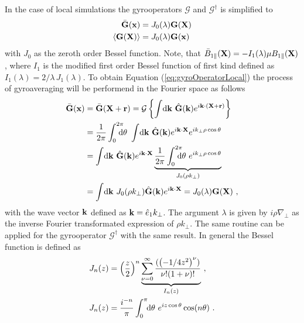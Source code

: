 In the case of local simulations the gyrooperators $\mathcal{G}$ and $\mathcal{G}^\dagger$ is simplified to
\begin{gather}
    \begin{aligned}
        \bar{\boldsymbol{\mathbf{G}}}(\boldsymbol{\mathbf{x}}) &= J_0(\lambda) \boldsymbol{\mathbf{G}}(\boldsymbol{\mathbf{X}}) \\
        \langle\boldsymbol{\mathbf{G}}(\boldsymbol{\mathbf{X}})\rangle &= J_0(\lambda) \boldsymbol{\mathbf{G}}(\boldsymbol{\mathbf{x}})
    \end{aligned}
    \label{eq:gyroOperatorLocal}
\end{gather}
with $J_0$ as the zeroth order Bessel function. Note, that $\bar{B}_{1\parallel}(\boldsymbol{\mathbf{X}}) = - I_1(\lambda)\mu B_{1\parallel} (\boldsymbol{\mathbf{X}})$, where $I_1$ is the modified first order Bessel function of first kind defined as $I_1(\lambda) = 2/\lambda \, J_1(\lambda)$. To obtain Equation (\ref{eq:gyroOperatorLocal}) the process of gyroaveraging will be performend in the Fourier space as follows
\begin{gather}
    \begin{aligned}
        \ga{\vect{G}}(\x) &= \ga{\vect{G}}(\X + \vect{r}) = \tga{\left\{\ints \mathrm{d}\vect{k} ~ \hat{\vect{G}}(\vect{k}) e^{i \vect{k} \cdot (\X + \vect{r})} \right\}} \\
                          &= \frac{1}{2\pi} \intss{0}{2\pi} \dtheta ~ \ints \mathrm{d}\vect{k} ~ \hat{\vect{G}}(\vect{k}) e^{i \vect{k} \cdot \X} e^{ i k_\perp \rho \cos \theta} \\
                          &= \ints \mathrm{d}\vect{k} ~ \hat{\vect{G}}(\vect{k}) e^{i \vect{k} \cdot \X} \underbrace{\frac{1}{2\pi} \intss{0}{2\pi} \dtheta ~ e^{ i k_\perp \rho \cos \theta}}_{J_0(\rho k_\perp)}\\
                          &= \ints \mathrm{d}\vect{k} ~ J_0(\rho k_\perp) \hat{\vect{G}}(\vect{k}) e^{i \vect{k} \cdot \X} = J_0(\lambda) \vect{G}(\X)~,
    \end{aligned}
    \label{eq:gyroOperatorLocalDerivation}
\end{gather}
with the wave vector $\boldsymbol{\mathbf{k}}$ defined as $\boldsymbol{\mathbf{k}} = \hat{e}_1 k_\perp$. The argument $\lambda$ is given by $i \rho \nabla_{\!\perp}$ as the inverse Fourier transformated expression of $\rho k_\perp$. The same routine can be applied for the gyrooperator $\mathcal{G}^\dagger$ with the same result. In general the Bessel function is defined as \cite{Dannert_PHD}
\begin{gather}
    \begin{aligned}
        J_n(z) &= \left(\frac{z}{2}\right)^n \underbrace{\sum^{\infty}_{\nu = 0} \frac{(\left(- 1/4 z^2\right)^\nu)}{\nu! (1 + \nu) !}}_{I_n(z)}~, \\
        J_n(z) &= \frac{i^{-n}}{\pi} \int_{0}^{\pi}\!\!\mathrm{d}\theta ~ e^{i z \cos \theta} \cos (n\theta)~.
    \end{aligned}
    \label{eq:Besselfunction}
\end{gather}

